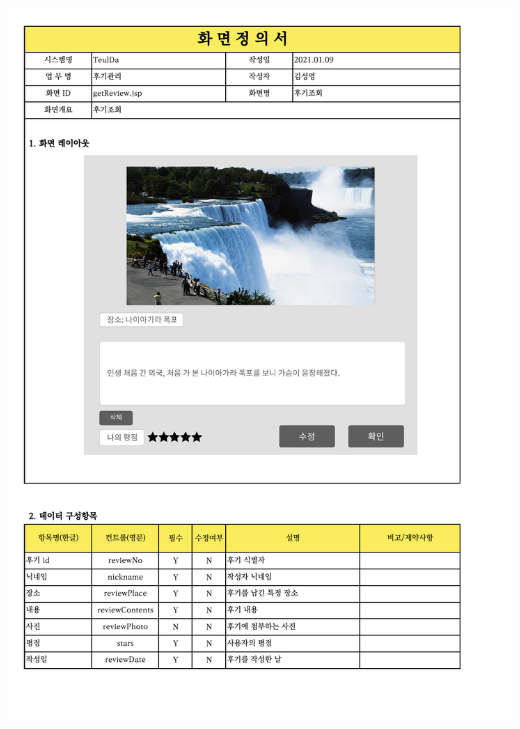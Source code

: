 {{{{{{{{{{{{{{{{{{{{{{{{{{{{\includegraphics[width=20cm]{./Figure/Analysis/Display/review/review_03.pdf} \\
}}}}}}}}}}}}}}}}}}}}}}}}}}}}
